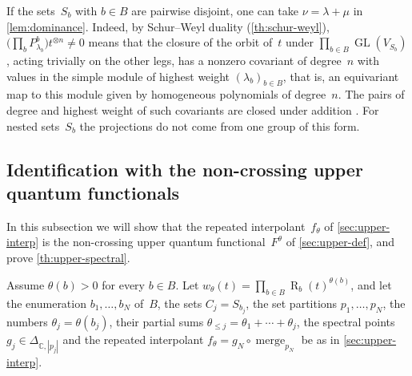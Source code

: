 \documentclass[11pt,letterpaper]{article}
\DeclareMathOperator{\tensorrank}{R}
\DeclareMathOperator{\merge}{merge}
\newcommand{\CC}{\mathbb{C}}
\DeclareMathOperator{\GL}{GL}
\begin{document}
If the sets~$S_b$ with $b \in B$ are pairwise disjoint, one can take $\nu = \lambda + \mu$ in \cref{lem:dominance}. Indeed, by Schur--Weyl duality (\cref{th:schur-weyl}), $\bigl( \prod_b P^b_{\lambda_b} \bigr) t^{\otimes n} \neq 0$ means that the closure of the orbit of~$t$ under $\prod_{b \in B} \GL(V_{S_b})$, acting trivially on the other legs, has a nonzero covariant of degree~$n$ with values in the simple module of highest weight $(\lambda_b)_{b \in B}$, that is, an equivariant map to this module given by homogeneous polynomials of degree~$n$. The pairs of degree and highest weight of such covariants are closed under addition \cite[proof of Proposition~2.1]{MR932055}. For nested sets~$S_b$ the projections do not come from one group of this form.

\subsection{Identification with the non-crossing upper quantum functionals}\label{sec:upper-identify}

In this subsection we will show that the repeated interpolant~$f_\theta$ of \cref{sec:upper-interp} is the non-crossing upper quantum functional~$F^\theta$ of \cref{sec:upper-def}, and prove \cref{th:upper-spectral}.

Assume $\theta(b) > 0$ for every $b \in B$. Let $w_\theta(t) = \prod_{b \in B} \tensorrank_b(t)^{\theta(b)}$, and let the enumeration $b_1, \ldots, b_N$ of~$B$, the sets $C_j = S_{b_j}$, the set partitions $p_1, \ldots, p_N$, the numbers $\theta_j = \theta(b_j)$, their partial sums $\theta_{\leq j} = \theta_1 + \cdots + \theta_j$, the spectral points $g_j \in \Delta_{\CC,|p_j|}$ and the repeated interpolant $f_\theta = g_N \circ \merge_{p_N}$ be as in \cref{sec:upper-interp}.
\end{document}

